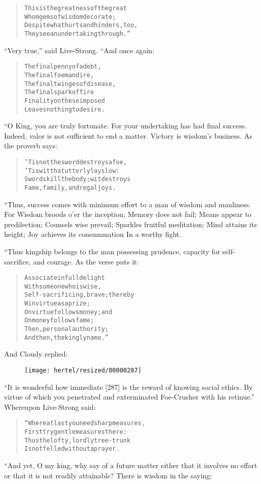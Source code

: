 \documentclass[article, twoside, 10pt]{memoir}
\renewenvironment{verbatim}{%
\begin{quote}%
\vskip -10pt%
\begin{alltt}\normalfont\small}{\end{alltt}%
\end{quote}%
\vskip -10pt
} %
\begin{document}
\begin{verbatim}
This is the greatness of the great
Whom gems of wisdom decorate;
Despite what hurts and hinders, too,
They see an undertaking through.”
\end{verbatim}
``Very true,'' said Live-Strong. “And once again:

\begin{verbatim}
The final penny of a debt,
    The final foeman dire,
The final twinges of disease,
    The final spark of fire{\textemdash}
Finality on these imposed
    Leaves nothing to desire.
\end{verbatim}
“O King, you are truly fortunate. For your undertaking has had
final success. Indeed, valor is not sufficient to end a matter.
Victory is wisdom's business. As the proverb says:

\begin{verbatim}
'Tis not the sword destroys a foe,
'Tis wit that utterly lays low:
Swords kill the body; wit destroys
Fame, family, and regal joys.
\end{verbatim}
“Thus, success comes with minimum effort to a man of wisdom and
manliness. For Wisdom broods o'er the inception; Memory does not
fail; Means appear to predilection; Counsels wise prevail; Sparkles
fruitful meditation; Mind attains its height; Joy achieves its
consummation In a worthy fight.

“Thus kingship belongs to the man possessing prudence, capacity for
self-sacrifice, and courage. As the verse puts it:

\begin{verbatim}
Associate in full delight
    With someone who is wise,
Self-sacrificing, brave; thereby
    Win virtue as a prize;
On virtue follows money; and
    On money follows fame;
Then, personal authority;
    And then, the kingly name.”
\end{verbatim}
And Cloudy replied:
\begin{figure}[p]\texttt{[image: hertel/resized/00000287]}\end{figure}``It is wonderful how immediate [287] is the reward of knowing social ethics. By virtue of which you penetrated and exterminated Foe-Crusher with his retinue.''
Whereupon Live-Strong said:

\begin{verbatim}
“Where at last you need sharp measures,
    First try gentle measures there:
Thus the lofty, lordly tree-trunk
    Is not felled without a prayer.
\end{verbatim}
“And yet, O my king, why say of a future matter either that it
involves no effort or that it is not readily attainable? There is
wisdom in the saying:
\end{document}
